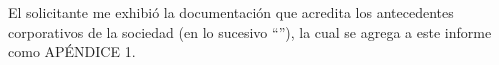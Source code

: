 El solicitante me exhibi\'o la documentaci\'on  que acredita los antecedentes corporativos de la sociedad \textcolor{principal}{\empresaSolicitante} (en lo sucesivo \textcolor{principal}{``\empresaCorto''}), la cual se agrega a este informe como \textcolor{secundario}{AP\'ENDICE 1}.